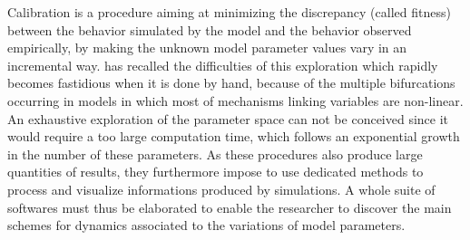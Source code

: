 \documentclass[10pt]{article}
\begin{document}
Calibration is a procedure aiming at minimizing the discrepancy (called fitness) between the behavior simulated by the model and the behavior observed empirically, by making the unknown model parameter values vary in an incremental way. \cite{stonedahl2011genetic} has recalled the difficulties of this exploration which rapidly becomes fastidious when it is done by hand, because of the multiple bifurcations occurring in models in which most of mechanisms linking variables are non-linear. An exhaustive exploration of the parameter space can not be conceived since it would require a too large computation time, which follows an exponential growth in the number of these parameters. As these procedures also produce large quantities of results, they furthermore impose to use dedicated methods to process and visualize informations produced by simulations. A whole suite of softwares must thus be elaborated to enable the researcher to discover the main schemes for dynamics associated to the variations of model parameters.
\end{document}

